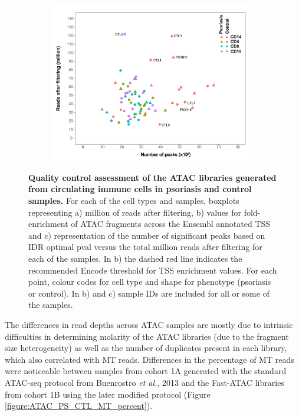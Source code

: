 \begin{figure}[htbp]
\begin{subfigure}{0.5\textwidth}
\caption{\textbf{}}
\end{subfigure}
\begin{subfigure}{0.5\textwidth}
\centering
\includegraphics[width=\textwidth]{./Results2/pdfs/ATAC_PS_CTL_reads_vs_peaks_dotplot}
\caption{\textbf{}}
\end{subfigure}
\caption[Quality control assessment of the ATAC libraries generated from circulating immune cells in psoriasis and control samples.]{\textbf{Quality control assessment of the ATAC libraries generated from circulating immune cells in psoriasis and control samples.} For each of the cell types and samples, boxplots representing a) million of reads after filtering, b) values for fold-enrichment of ATAC fragments across the Ensembl annotated TSS and c) representation of the  number of significant peaks based on IDR optimal pval versus the total million reads after filtering for each of the samples. In b) the dashed red line indicates the recommended Encode threshold for TSS enrichment values. For each point, colour codes for cell type and shape for phenotype (psoriasis or control). In b) and c) sample IDs are included for all or some of the samples.}
\label{figure:ATAC_PS_CTL_QC}
\end{figure} 


The differences in read depths across ATAC samples are mostly due to intrinsic difficulties in determining molarity of the ATAC libraries (due to the fragment size heterogeneity) as well as the number of duplicates present in each library, which also correlated with MT reads. Differences in the percentage of MT reads were noticeable between samples from cohort 1A generated with the standard ATAC-seq protocol from Buenrostro \textit{et al.}, 2013 and the Fast-ATAC libraries from cohort 1B using the later modified \parencite{Corces2016} protocol (Figure \ref{figure:ATAC_PS_CTL_MT_percent}). 

